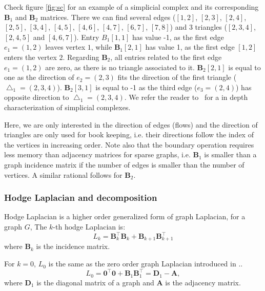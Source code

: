 Check figure \ref{fig:sc} for an example of a simplicial complex and its corresponding $\mathbf{B}_1$ and $\mathbf{B}_2$ matrices. There we can find several edges ($[1,2]$, $[2,3]$, $[2,4]$, $[2,5]$, $[3,4]$, $[4,5]$, $[4,6]$, $[4,7]$, $[6,7]$, $[7,8]$) and  3 triangles ($[2,3,4]$, $[2,4,5]$ and $[4,6,7]$). Entry $B_1 [1,1]$ has value -1, as the first edge $e_1=(1,2)$ leaves vertex $1$, while $\mathbf{B}_1[2,1]$ has value 1, as the first edge $[1,2]$ enters the vertex $2$. Regarding $\mathbf{B}_2$, all entries related to the first edge  $e_1=(1,2)$ are zero, as there is no triangle associated to it. $\mathbf{B}_2[2,1]$ is equal to one as the direction of  $e_2=(2,3)$ fits the direction of the first triangle ($\bigtriangleup_1=(2,3,4)$). $\mathbf{B}_2[3,1]$ is equal to -1 as the third edge ($e_3=(2,4)$) has opposite direction to $\bigtriangleup_1=(2,3,4)$. We refer the reader to~\citep{Schaub2020} for a in depth characterization of simplicial complexes.

Here, we are only interested in the direction of edges (flows) and the direction of triangles are only used for book keeping, i.e. their directions follow the index of the vertices in increasing order. Note also that the boundary operation requires less memory than adjacency matrices for sparse graphs, i.e. $\mathbf{B}_1$ is smaller than a graph incidence matrix if the number of edges is smaller than the number of vertices. A similar rational follows for $\mathbf{B}_2$.


\subsubsection{Hodge Laplacian and decomposition}

Hodge Laplacian is a higher order generalized form of graph Laplacian, for a graph $G$, The $k$-th hodge Laplacian is:
\begin{equation}
\label{eqn:hodgeLaplacian}
{L}_k = \mathbf{B}_{k}^\top \mathbf{B}_{k} + \mathbf{B}_{k+1} \mathbf{B}_{k+1}^\top
\end{equation}
where $\mathbf{B}_k$ is the incidence matrix.

For $k=0$, ${L}_0$ is the same as the zero order graph Laplacian introduced in ..
\begin{equation}
\label{eqn:graphLaplacian}
{L}_0 =  \mathbf{0}^\top  \mathbf{0} + \mathbf{B}_{1} \mathbf{B}_{1}^\top =  \mathbf{D}_1 - \mathbf{A},
\end{equation}
\noindent where $\mathbf{D}_1$ is the diagonal matrix of a graph and $\mathbf{A}$ is the adjacency matrix.

